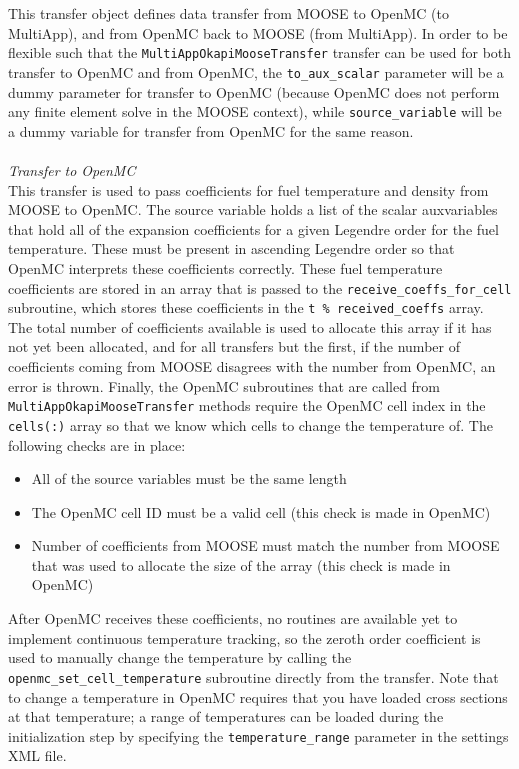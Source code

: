 \documentclass[10pt]{article}
\newcounter{subsubsubsection}[subsubsection]
\numberwithin{equation}{section} %
\begin{document}
This transfer object defines data transfer from MOOSE to OpenMC (to MultiApp), and from OpenMC back to MOOSE (from MultiApp). In order to be flexible such that the {\tt MultiAppOkapiMooseTransfer} transfer can be used for both transfer to OpenMC and from OpenMC, the {\tt to\_aux\_scalar} parameter will be a dummy parameter for transfer to OpenMC (because OpenMC does not perform any finite element solve in the MOOSE context), while {\tt source\_variable} will be a dummy variable for transfer from OpenMC for the same reason.
\\\\
{\it Transfer to OpenMC}\\
This transfer is used to pass coefficients for fuel temperature and density from MOOSE to OpenMC. The source variable holds a list of the scalar auxvariables that hold all of the expansion coefficients for a given Legendre order for the fuel temperature. These must be present in ascending Legendre order so that OpenMC interprets these coefficients correctly. These fuel temperature coefficients are stored in an array that is passed to the {\tt receive\_coeffs\_for\_cell} subroutine, which stores these coefficients in the {\tt t \% received\_coeffs} array. The total number of coefficients available is used to allocate this array if it has not yet been allocated, and for all transfers but the first, if the number of coefficients coming from MOOSE disagrees with the number from OpenMC, an error is thrown. Finally, the OpenMC subroutines that are called from {\tt MultiAppOkapiMooseTransfer} methods require the OpenMC cell index in the {\tt cells(:)} array so that we know which cells to change the temperature of. The following checks are in place:

\begin{itemize}
\item All of the source variables must be the same length
\item The OpenMC cell ID must be a valid cell (this check is made in OpenMC)
\item Number of coefficients from MOOSE must match the number from MOOSE that was used to allocate the size of the array (this check is made in OpenMC)
\end{itemize}

After OpenMC receives these coefficients, no routines are available yet to implement continuous temperature tracking, so the zeroth order coefficient is used to manually change the temperature by calling the {\tt openmc\_set\_cell\_temperature} subroutine directly from the transfer. Note that to change a temperature in OpenMC requires that you have loaded cross sections at that temperature; a range of temperatures can be loaded during the initialization step by specifying the {\tt temperature\_range} parameter in the settings XML file.
\end{document}
